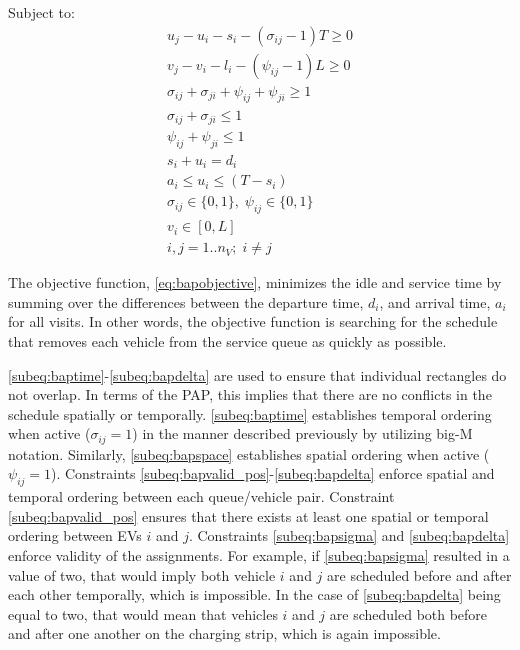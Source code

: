 \documentclass[ee,thesis]{usuthesis}
\begin{document}
Subject to:
\begin{subequations}
\label{eq:bapconstrs}
\begin{align}
    u_j - u_i - s_i - (\sigma_{ij} - 1)T \geq 0   \label{subeq:baptime}          \\
    v_j - v_i - l_i - (\psi_{ij} - 1)L \geq 0   \label{subeq:bapspace}           \\
    \sigma_{ij} + \sigma_{ji} + \psi_{ij} + \psi_{ji} \geq 1 \label{subeq:bapvalid_pos}     \\
    \sigma_{ij} + \sigma_{ji} \leq 1                   \label{subeq:bapsigma}        \\
    \psi_{ij} + \psi_{ji} \leq 1                   \label{subeq:bapdelta}        \\
    s_i + u_i = d_i                       \label{subeq:bapdetach}       \\
    a_i \leq u_i \leq (T - s_i)                 \label{subeq:bapvalid_starts} \\
    \sigma_{ij} \in \{0,1\},\;\psi_{ij} \in \{0,1\}\; \label{subeq:bapsdspace}      \\
    v_i \in [0, L]                         \label{subeq:bapvspace} \\
    i,j = 1..n_V;\; i \ne j                \label{subeq:ijspace}
\end{align}
\end{subequations}

\noindent The objective function, \autoref{eq:bapobjective}, minimizes the idle and service time by summing over the
differences between the departure time, \(d_i\), and arrival time, \(a_i\) for all visits. In other words, the objective
function is searching for the schedule that removes each vehicle from the service queue as quickly as possible.

\autoref{subeq:baptime}-\autoref{subeq:bapdelta} are used to ensure that individual rectangles do not overlap. In terms
of the PAP, this implies that there are no conflicts in the schedule spatially or temporally. \autoref{subeq:baptime}
establishes temporal ordering when active (\(\sigma_{ij}=1\)) in the manner described previously by utilizing big-M notation.
Similarly, \autoref{subeq:bapspace} establishes spatial ordering when active (\(\psi_{ij} =1\)). Constraints
\autoref{subeq:bapvalid_pos}-\autoref{subeq:bapdelta} enforce spatial and temporal ordering between each queue/vehicle
pair. Constraint \autoref{subeq:bapvalid_pos} ensures that there exists at least one spatial or temporal ordering between EVs \(i\) and \(j\). Constraints \autoref{subeq:bapsigma} and \autoref{subeq:bapdelta} enforce validity of the assignments. For
example, if \autoref{subeq:bapsigma} resulted in a value of two, that would imply both vehicle \(i\) and \(j\) are scheduled
before and after each other temporally, which is impossible. In the case of \autoref{subeq:bapdelta} being equal to
two, that would mean that vehicles \(i\) and \(j\) are scheduled both before and after one another on the charging strip,
which is again impossible.
\end{document}

